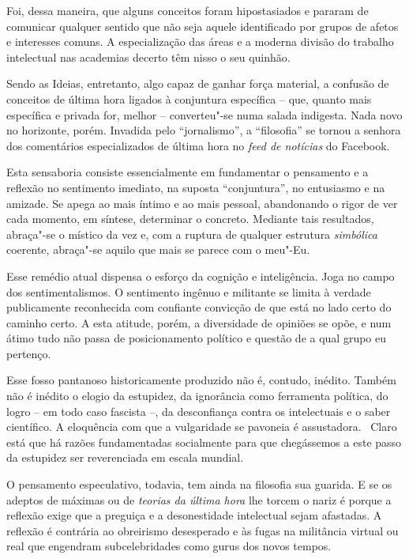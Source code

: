 Foi, dessa maneira, que alguns conceitos foram hipostasiados e pararam
de comunicar qualquer sentido que não seja aquele identificado por
grupos de afetos e interesses comuns. A especialização das áreas e a
moderna divisão do trabalho intelectual nas academias decerto têm nisso
o seu quinhão.

Sendo as Ideias, entretanto, algo capaz de ganhar força material, a
confusão de conceitos de última hora ligados à conjuntura específica --
que, quanto mais específica e privada for, melhor -- converteu"-se numa
salada indigesta. Nada novo no horizonte, porém. Invadida pelo
``jornalismo'', a ``filosofia'' se tornou a senhora dos comentários
especializados de última hora no \emph{feed de notícias} do Facebook.

Esta sensaboria consiste essencialmente em fundamentar o pensamento e a
reflexão no sentimento imediato, na suposta ``conjuntura'', no
entusiasmo e na amizade. Se apega ao mais íntimo e ao mais pessoal,
abandonando o rigor de ver cada momento, em síntese, determinar o
concreto. Mediante tais resultados, abraça"-se o místico da vez e, com a
ruptura de qualquer estrutura \emph{simbólica} coerente, abraça"-se
aquilo que mais se parece com o meu"-Eu.

Esse remédio atual dispensa o esforço da cognição e inteligência. Joga
no campo dos sentimentalismos. O sentimento ingênuo e militante se
limita à verdade publicamente reconhecida com confiante convicção de que
está no lado certo do caminho certo. A esta atitude, porém, a
diversidade de opiniões se opõe, e num átimo tudo não passa de
posicionamento político e questão de a qual grupo eu pertenço.

Esse fosso pantanoso historicamente produzido não é, contudo, inédito.
Também não é inédito o elogio da estupidez, da ignorância como
ferramenta política, do logro -- em todo caso fascista --, da
desconfiança contra os intelectuais e o saber científico. A eloquência
com que a vulgaridade se pavoneia é assustadora.~ Claro está que há
razões fundamentadas socialmente para que chegássemos a este passo da
estupidez ser reverenciada em escala mundial.

O pensamento especulativo, todavia, tem ainda na filosofia sua guarida.
E se os adeptos de máximas ou de \emph{teorias da última hora} lhe
torcem o nariz é porque a reflexão exige que a preguiça e a
desonestidade intelectual sejam afastadas. A reflexão é contrária ao
obreirismo desesperado e às fugas na militância virtual ou real que
engendram subcelebridades como gurus dos novos tempos.

